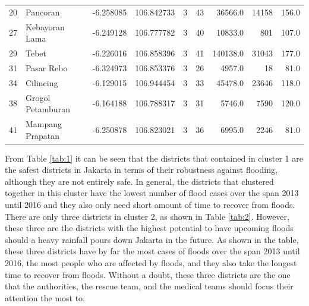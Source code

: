 \begin{table}
\begin{adjustbox}{width=\textwidth}
\begin{tabular}{llrrrrrrr}
20 &           Pancoran & -6.258085 &  106.842733 &               3 &            43 &                 36566.0 &                             14158 &                   156.0 \\
27 &     Kebayoran Lama & -6.249128 &  106.777782 &               3 &            40 &                 10833.0 &                               801 &                   107.0 \\
29 &              Tebet & -6.226016 &  106.858396 &               3 &            41 &                140138.0 &                             31043 &                   177.0 \\
31 &         Pasar Rebo & -6.324973 &  106.853376 &               3 &            26 &                  4957.0 &                                18 &                    81.0 \\
34 &          Cilincing & -6.129015 &  106.944454 &               3 &            33 &                 45478.0 &                             23646 &                   118.0 \\
38 &  Grogol Petamburan & -6.164188 &  106.788317 &               3 &            31 &                  5746.0 &                              7590 &                   120.0 \\
41 &   Mampang Prapatan & -6.250878 &  106.823021 &               3 &            36 &                  6995.0 &                              2246 &                    81.0 \\
\bottomrule
\end{tabular}
\end{adjustbox}
\end{table}

\noindent
From Table \ref{tab:1} it can be seen that the districts that contained in cluster 1 are the safest districts in Jakarta in terms of their robustness against flooding, although they are not entirely safe. In general, the districts that clustered together in this cluster have the lowest number of flood cases over the span 2013 until 2016 and they also only need short amount of time to recover from floods.\\

\noindent
There are only three districts in cluster 2, as shown in Table \ref{tab:2}. However, these three are the districts with the highest potential to have upcoming floods should a heavy rainfall pours down Jakarta in the future. As shown in the table, these three districts have by far the most cases of floods over the span 2013 until 2016, the most people who are affected by floods, and they also take the longest time to recover from floods. Without a doubt, these three districts are the one that the authorities, the rescue team, and the medical teams should focus their attention the most to.\\

